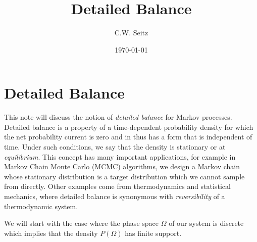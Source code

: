 \documentclass{article}
\title{Detailed Balance}
\author{C.W. Seitz}
\date{\today}
\begin{document}
\maketitle

\section{Detailed Balance}

This note will discuss the notion of \emph{detailed balance} for Markov processes. Detailed balance is a property of a time-dependent probability density for which the net probability current is zero and in thus has a form that is independent of time. Under such conditions, we say that the density is stationary or at \emph{equilibrium}. This concept has many important applications, for example in Markov Chain Monte Carlo (MCMC) algorithms, we design a Markov chain whose stationary distribution is a target distribution which we cannot sample from directly. Other examples come from thermodynamics and statistical mechanics, where detailed balance is synonymous with \emph{reversibility} of a thermodynamic system.\\
\vspace{0.05in}

We will start with the case where the phase space $\Omega$ of our system is discrete which implies that the density $P(\Omega)$ has finite support.
\end{document}
